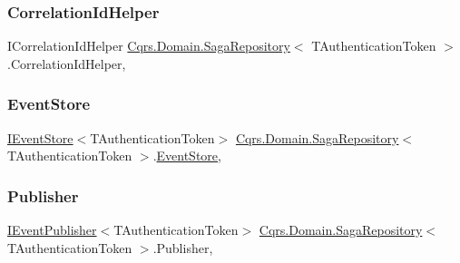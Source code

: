 \subsubsection{\texorpdfstring{Correlation\+Id\+Helper}{CorrelationIdHelper}}
{\footnotesize\ttfamily I\+Correlation\+Id\+Helper \hyperlink{classCqrs_1_1Domain_1_1SagaRepository}{Cqrs.\+Domain.\+Saga\+Repository}$<$ T\+Authentication\+Token $>$.Correlation\+Id\+Helper\hspace{0.3cm}{\ttfamily [get]}, {\ttfamily [protected]}}

\mbox{\label{classCqrs_1_1Domain_1_1SagaRepository_a4b872f1a20660ece8ce1b54720193fda_a4b872f1a20660ece8ce1b54720193fda}} 
\subsubsection{\texorpdfstring{Event\+Store}{EventStore}}
{\footnotesize\ttfamily \hyperlink{interfaceCqrs_1_1Events_1_1IEventStore}{I\+Event\+Store}$<$T\+Authentication\+Token$>$ \hyperlink{classCqrs_1_1Domain_1_1SagaRepository}{Cqrs.\+Domain.\+Saga\+Repository}$<$ T\+Authentication\+Token $>$.\hyperlink{classCqrs_1_1Events_1_1EventStore}{Event\+Store}\hspace{0.3cm}{\ttfamily [get]}, {\ttfamily [protected]}}

\mbox{\label{classCqrs_1_1Domain_1_1SagaRepository_a94707dc4549d096ea3cf5d241117495a_a94707dc4549d096ea3cf5d241117495a}} 
\subsubsection{\texorpdfstring{Publisher}{Publisher}}
{\footnotesize\ttfamily \hyperlink{interfaceCqrs_1_1Events_1_1IEventPublisher}{I\+Event\+Publisher}$<$T\+Authentication\+Token$>$ \hyperlink{classCqrs_1_1Domain_1_1SagaRepository}{Cqrs.\+Domain.\+Saga\+Repository}$<$ T\+Authentication\+Token $>$.Publisher\hspace{0.3cm}{\ttfamily [get]}, {\ttfamily [protected]}}

